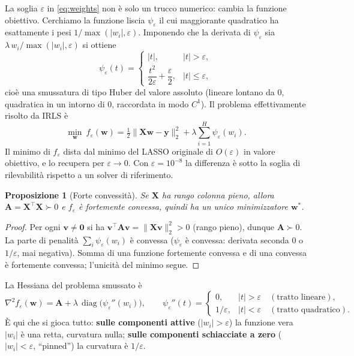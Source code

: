 \documentclass[11pt,a4paper]{article}
\newtheorem{proposition}{Proposizione}
\theoremstyle{definition}
\newcommand{\w}{\bm{w}}
\newcommand{\X}{\bm{X}}
\newcommand{\y}{\bm{y}}
\newcommand{\A}{\bm{A}}
\newcommand{\wstar}{\w^{*}}
\newcommand{\diag}{\operatorname{diag}}
\newcommand{\lam}{\lambda}
\newcommand{\eps}{\varepsilon}
\begin{document}
La soglia $\eps$ in \eqref{eq:weights} non è solo un trucco numerico: cambia la funzione
obiettivo. Cerchiamo la funzione liscia $\psi_\eps$ il cui maggiorante quadratico ha
esattamente i pesi $1/\max(|w_i|,\eps)$. Imponendo che la derivata di $\psi_\eps$ sia
$\lam\,w_i/\max(|w_i|,\eps)$ si ottiene
\begin{equation}
\label{eq:huber}
\psi_\eps(t)=
\begin{cases}
|t|, & |t|>\eps,\\[2pt]
\dfrac{t^2}{2\eps}+\dfrac{\eps}{2}, & |t|\le\eps,
\end{cases}
\end{equation}
cioè una smussatura di tipo Huber del valore assoluto (lineare lontano da $0$, quadratica
in un intorno di $0$, raccordata in modo $C^1$). Il problema effettivamente risolto da IRLS è
\begin{equation}
\label{eq:feps}
\min_{\w}\ f_\eps(\w)=\tfrac12\|\X\w-\y\|_2^2+\lam\sum_{i=1}^H\psi_\eps(w_i).
\end{equation}
Il minimo di $f_\eps$ dista dal minimo del LASSO originale di $O(\eps)$ in valore obiettivo,
e lo recupera per $\eps\to0$. Con $\eps=10^{-8}$ la differenza è sotto la soglia di
rilevabilità rispetto a un solver di riferimento.

\begin{proposition}[Forte convessità]
\label{prop:strong}
Se $\X$ ha rango colonna pieno, allora $\A=\X^{\!\top}\X\succ0$ e $f_\eps$ è
\emph{fortemente convessa}, quindi ha un unico minimizzatore $\wstar$.
\end{proposition}
\begin{proof}
Per ogni $\bm v\neq\bm0$ si ha $\bm v^{\!\top}\A\bm v=\|\X\bm v\|_2^2>0$ (rango pieno),
dunque $\A\succ0$. La parte di penalità $\sum_i\psi_\eps(w_i)$ è convessa ($\psi_\eps$ è
convessa: derivata seconda $0$ o $1/\eps$, mai negativa). Somma di una funzione fortemente
convessa e di una convessa è fortemente convessa; l'unicità del minimo segue.
\end{proof}

\noindent La Hessiana del problema smussato è
\begin{equation}
\label{eq:hessian}
\nabla^2 f_\eps(\w)=\A+\lam\,\diag\!\big(\psi_\eps''(w_i)\big),\qquad
\psi_\eps''(t)=
\begin{cases}
0, & |t|>\eps \quad(\text{tratto lineare}),\\[2pt]
1/\eps, & |t|<\eps \quad(\text{tratto quadratico}).
\end{cases}
\end{equation}
È qui che si gioca tutto: \textbf{sulle componenti attive} ($|w_i|>\eps$) la funzione vera
$|w_i|$ è una retta, curvatura nulla; \textbf{sulle componenti schiacciate a zero}
($|w_i|<\eps$, ``pinned'') la curvatura è $1/\eps$.
\end{document}
